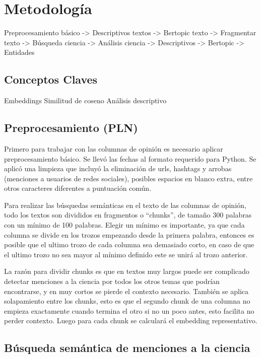 \documentclass[11pt,a4paper]{article}
\begin{document}
	\section{Metodología}
	Preprocesamiento básico -> Descriptivos textos -> Bertopic texto -> Fragmentar texto -> Búsqueda ciencia -> Análisis ciencia -> Descriptivos -> Bertopic -> Entidades
	
	\subsection{Conceptos Claves}
	Embeddings
	Similitud de coseno
	Análisis descriptivo
	
	
	
	
	\subsection{Preprocesamiento (PLN)}
	
	Primero para trabajar con las columnas de opinión es necesario aplicar preprocesamiento básico. Se llevó las fechas al formato requerido para Python. Se aplicó una limpieza que incluyó la eliminación de urls, hashtags y arrobas (menciones a usuarios de redes sociales), posibles espacios en blanco extra, entre otros caracteres diferentes a puntuación común.
	
	Para realizar las búsquedas semánticas en el texto de las columnas de opinión, todo los textos son divididos en fragmentos o ``chunks'', de tamaño 300 palabras con un mínimo de 100 palabras. Elegir un mínimo es importante, ya que cada columna se divide en los trozos empezando desde la primera palabra, entonces es posible que el ultimo trozo de cada columna sea demasiado corto, en caso de que el ultimo trozo no sea mayor al mínimo definido este se unirá al trozo anterior.
	
	
	La razón para dividir chunks es que en textos muy largos puede ser complicado detectar menciones a la ciencia por todos los otros temas que podrían encontrarse, y en muy cortos se pierde el contexto necesario. También se aplica solapamiento entre los chunks, esto es que el segundo chunk de una columna no empieza exactamente cuando termina el otro si no un poco antes, esto facilita no perder contexto. 
	Luego para cada chunk se calculará el embedding representativo. 
	
	
	
	\subsection{Búsqueda semántica de menciones a la ciencia}
	
\end{document}
